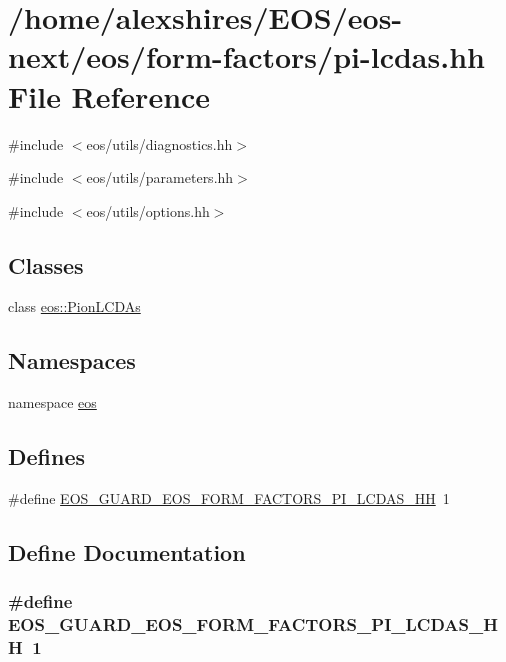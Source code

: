 \hypertarget{pi-lcdas_8hh}{
\section{/home/alexshires/EOS/eos-\/next/eos/form-\/factors/pi-\/lcdas.hh File Reference}
\label{pi-lcdas_8hh}
}
{\ttfamily \#include $<$eos/utils/diagnostics.hh$>$}\par
{\ttfamily \#include $<$eos/utils/parameters.hh$>$}\par
{\ttfamily \#include $<$eos/utils/options.hh$>$}\par
\subsection*{Classes}
\begin{DoxyCompactItemize}
\item 
class \hyperlink{classeos_1_1PionLCDAs}{eos::PionLCDAs}
\end{DoxyCompactItemize}
\subsection*{Namespaces}
\begin{DoxyCompactItemize}
\item 
namespace \hyperlink{namespaceeos}{eos}
\end{DoxyCompactItemize}
\subsection*{Defines}
\begin{DoxyCompactItemize}
\item 
\#define \hyperlink{pi-lcdas_8hh_abfa4ecec276f0fd748f8596f3b75e3d3}{EOS\_\-GUARD\_\-EOS\_\-FORM\_\-FACTORS\_\-PI\_\-LCDAS\_\-HH}~1
\end{DoxyCompactItemize}


\subsection{Define Documentation}
\hypertarget{pi-lcdas_8hh_abfa4ecec276f0fd748f8596f3b75e3d3}{
\subsubsection[{EOS\_\-GUARD\_\-EOS\_\-FORM\_\-FACTORS\_\-PI\_\-LCDAS\_\-HH}]{\setlength{\rightskip}{0pt plus 5cm}\#define EOS\_\-GUARD\_\-EOS\_\-FORM\_\-FACTORS\_\-PI\_\-LCDAS\_\-HH~1}}
\label{pi-lcdas_8hh_abfa4ecec276f0fd748f8596f3b75e3d3}
